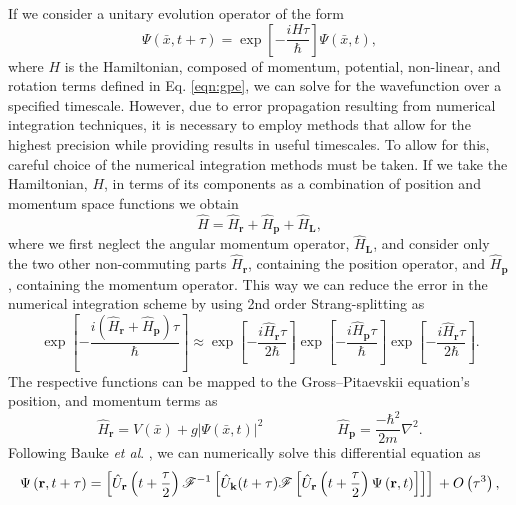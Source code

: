 If we consider a unitary evolution operator of the form
\begin{equation}\label{eqn:1}
\Psi(\bar{x},t+\tau) = \exp\left[ -\frac{iH\tau}{\hbar}\right]\Psi(\bar{x},t),
\end{equation}
where $H$ is the Hamiltonian, composed of momentum, potential, non-linear, and rotation terms defined in Eq. \eqref{eqn:gpe}, we can solve for the wavefunction over a specified timescale. However, due to error propagation resulting from numerical integration techniques, it is necessary to employ methods that allow for the highest precision while providing results in useful timescales. To allow for this, careful choice of the numerical integration methods must be taken.  If we take the Hamiltonian, $H$, in terms of its components as a combination of position and momentum space functions we obtain
\begin{equation}\label{eqn:2}
\hat{H} = \hat{H}_{\textbf{r}} + \hat{H}_{\textbf{p}} + \hat{H}_{\textbf{L}},
\end{equation}
where we first neglect the angular momentum operator, $\hat{H}_{\textbf{L}}$, and consider only the two other non-commuting parts $\hat{H}_{\textbf{r}}$, containing the position operator, and $\hat{H}_{\textbf{p}}$, containing the momentum operator. This way we can reduce the error in the numerical integration scheme by using 2nd order Strang-splitting as
\begin{equation}\label{eqn:3}
\exp\left[ -\frac{ i\left(\hat{H}_{\textbf{r}} + \hat{H}_{\textbf{p}}\right)\tau}{\hbar} \right] \approx \exp\left[- \frac{i\hat{H}_{\textbf{r}}\tau}{2\hbar} \right]\exp\left[-\frac{i\hat{H}_{\textbf{p}}\tau}{\hbar}\right]\exp\left[ -\frac{i\hat{H}_{\textbf{r}}\tau}{2\hbar}\right].
\end{equation}
The respective functions can be mapped to the Gross--Pitaevskii equation's position, and momentum terms as
\begin{equation}
\hat{H}_{\textbf{r}} = V(\bar{x}) + g\vert\Psi(\bar{x},t)\vert^2\; \hspace{5em} \hat{H}_{\textbf{p}} = \frac{-\hbar^2}{2m}\nabla^2.
\end{equation}
Following Bauke \textit{et al}. \cite{Num:Bauke_cpc_2011}, we can numerically solve this differential equation as
\begin{equation}
\Psi\left(\textbf{r},t+\tau\right) = \left[\hat{U}_{\mathbf{r}}\left(t+\frac{\tau}{2}\right) \mathscr{F}^{-1} \left[ \hat{U}_{\mathbf{k}}(t+\tau) \mathscr{F} \left[ \hat{U}_{\mathbf{r}}\left(t+\frac{\tau}{2}\right) \Psi\left(\mathbf{r},t\right) \right] \right] \right]  \\ + O\left(\tau^3\right),
\end{equation}
